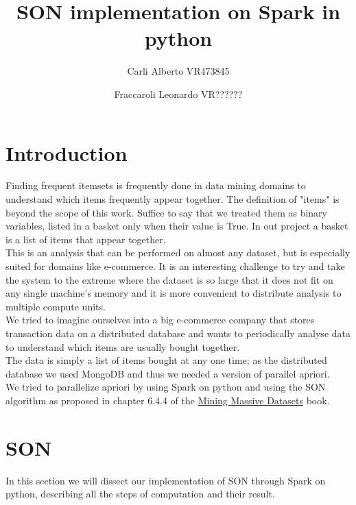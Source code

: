 \documentclass[a4paper]{article}
\title{SON implementation on Spark in python}
\author{Carli Alberto VR473845\and Fraccaroli Leonardo VR??????}
\date{}
\begin{document}
	\maketitle
	\tableofcontents
	\medskip
	\section{Introduction}
	Finding frequent itemsets is frequently done in data mining domains to understand which items frequently appear together. The definition of "items" is beyond the scope of this work. Suffice to say that we treated them as binary variables, listed in a basket only when their value is True. In out project a basket is a list of items that appear together.\\
	
	This is an analysis that can be performed on almost any dataset, but is especially suited for domains like e-commerce. It is an interesting challenge to try and take the system to the extreme where the dataset is so large that it does not fit on any single machine's memory and it is more convenient to distribute analysis to multiple compute units.\\
	
	We tried to imagine ourselves into a big e-commerce company that stores transaction data on a distributed database and wants to periodically analyse data to understand which items are usually bought together. \\
	The data is simply a list of items bought at any one time; as the distributed database we used MongoDB and thus we needed a version of parallel apriori. \\
	We tried to parallelize apriori by using Spark on python and using the SON algorithm as proposed in chapter 6.4.4 of the \href{http://www.mmds.org/}{Mining Massive Datasets} book.
	\newpage

	\section{SON}
	In this section we will dissect our implementation of SON through Spark on python, describing all the steps of computation and their result.\\
	
\end{document}

